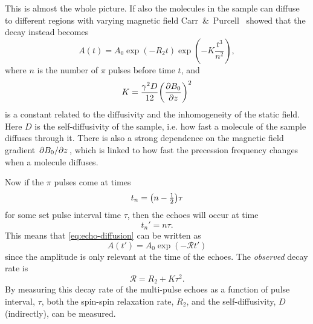 \documentclass[11pt,a4paper, twocolumn,
swedish, english %
]{article}
\begin{document}
This is almost the whole picture. If also the molecules in the sample can
diffuse to different regions with varying magnetic field
Carr~\&~Purcell~\cite{Carr-Purcell1954} showed that the decay instead
becomes 
\begin{equation}\label{eq:echo-diffusion}
A(t)=A_0\exp(-R_2t)
\exp(-K\frac{t^3}{n^2}),
\end{equation}
where $n$ is the number of $\pi$ pulses before time $t$, and 
\begin{equation}\label{eq:K_simple}
K=\frac{\gamma^2D}{12}\qty(\pdv{B_0}{z})^2
\end{equation}
is a constant related to the diffusivity and the inhomogeneity of
the static field. Here $D$ is the self-diffusivity of the sample,
i.e. how fast a molecule of the sample diffuses through it. There is
also a strong dependence on the magnetic field gradient
$\pdv*{B_0}{z}$, which is linked to how fast the precession frequency
changes when a molecule diffuses. 

Now if the $\pi$ pulses come at times
\begin{equation}\label{eq:pulse-times}
t_{n}=\qty(n-\tfrac{1}{2})\tau
\end{equation}
for some set pulse interval time $\tau$, then the echoes will occur at
time  
\begin{equation}
t_n'=n\tau.
\end{equation}
This means that \eqref{eq:echo-diffusion} can be written as
\begin{equation}\label{eq:multi-pulse_single}
A(t')=A_0\exp(-\mathcal{R}t')
\end{equation}
since the amplitude is only relevant at the time of the echoes. The
\emph{observed} decay rate is
\begin{equation}\label{eq:multi-pulse-rate}
\mathcal{R}=R_2+K\tau^2.
\end{equation}
By measuring this decay rate of the multi-pulse echoes as a function
of pulse interval, $\tau$, both the spin-spin relaxation rate, $R_2$,
and the self-diffusivity, $D$ (indirectly), can be measured. 
\end{document}

